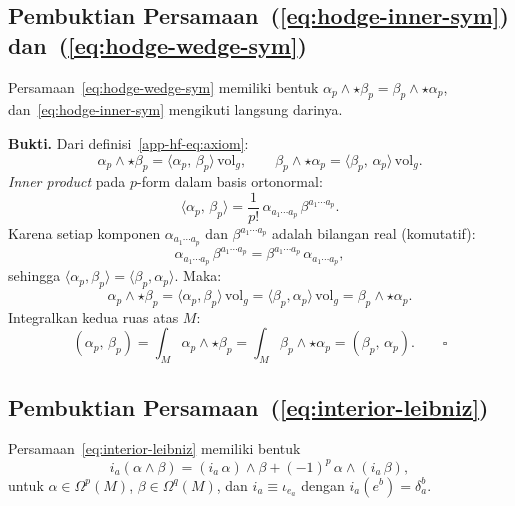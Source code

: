  
 
\subsection{Pembuktian Persamaan~(\ref{eq:hodge-inner-sym}) dan~(\ref{eq:hodge-wedge-sym})}
\label{app:proof-hodge-symmetry}
 
Persamaan~\eqref{eq:hodge-wedge-sym} memiliki bentuk $\alpha_p \wedge \star\beta_p = \beta_p \wedge \star\alpha_p$, dan~\eqref{eq:hodge-inner-sym} mengikuti langsung darinya.
 
\bigskip\noindent\textbf{Bukti.} Dari definisi~\eqref{app-hf-eq:axiom}:
\begin{equation}
    \alpha_p \wedge \star\beta_p = \langle\alpha_p,\,\beta_p\rangle\,\mathrm{vol}_g, \qquad
    \beta_p \wedge \star\alpha_p = \langle\beta_p,\,\alpha_p\rangle\,\mathrm{vol}_g.
\end{equation}
\textit{Inner product} pada $p$-form dalam basis ortonormal:
\begin{equation}
    \langle\alpha_p,\,\beta_p\rangle = \frac{1}{p!}\,\alpha_{a_1 \cdots a_p}\,\beta^{a_1 \cdots a_p}.
\end{equation}
Karena setiap komponen $\alpha_{a_1 \cdots a_p}$ dan $\beta^{a_1 \cdots a_p}$ adalah bilangan real (komutatif):
\begin{equation}
    \alpha_{a_1 \cdots a_p}\,\beta^{a_1 \cdots a_p} = \beta^{a_1 \cdots a_p}\,\alpha_{a_1 \cdots a_p},
\end{equation}
sehingga $\langle\alpha_p,\beta_p\rangle = \langle\beta_p,\alpha_p\rangle$. Maka:
\begin{equation}
    \alpha_p \wedge \star\beta_p = \langle\alpha_p,\beta_p\rangle\,\mathrm{vol}_g = \langle\beta_p,\alpha_p\rangle\,\mathrm{vol}_g = \beta_p \wedge \star\alpha_p.
\end{equation}
Integralkan kedua ruas atas $M$:
\begin{equation}
    (\alpha_p,\,\beta_p) = \int_M \alpha_p \wedge \star\beta_p = \int_M \beta_p \wedge \star\alpha_p = (\beta_p,\,\alpha_p). \qquad\square
\end{equation}

\subsection{Pembuktian Persamaan~(\ref{eq:interior-leibniz})}
\label{app:proof-interior-leibniz}
 
Persamaan~\eqref{eq:interior-leibniz} memiliki bentuk
\begin{equation*}
    i_a(\alpha \wedge \beta) = (i_a\,\alpha) \wedge \beta + (-1)^p\,\alpha \wedge (i_a\,\beta),
\end{equation*}
untuk $\alpha \in \Omega^p(M)$, $\beta \in \Omega^q(M)$, dan $i_a \equiv \iota_{e_a}$ dengan $i_a(e^b) = \delta^b_a$.
 
